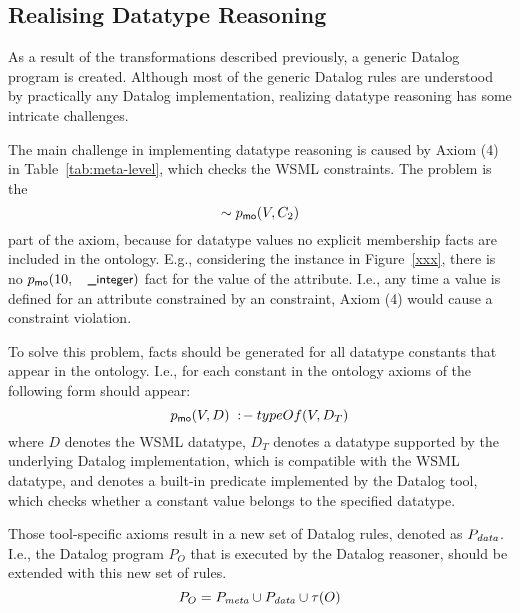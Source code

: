 \def\dataaxioms{\ensuremath{P_{\smtxtit{data}}}\xspace}
\def\transdpred{\transtxt{dpred}}

\subsection{Realising Datatype Reasoning}
\label{sec:datatype_reasoning}
As a result
of the transformations described previously, a generic Datalog
program is created. Although most of the generic Datalog rules are understood by practically any
Datalog implementation, realizing datatype reasoning has some
intricate challenges.

The main challenge in implementing datatype reasoning is caused by Axiom (4) in Table~\ref{tab:meta-level}, which checks the WSML  constraints. The problem is the \[\sim p_{\mathrm{\sf mo}}(V,C_2)\] part of the axiom, because for datatype values no explicit membership facts are included in the ontology. E.g., considering the instance  in Figure~\ref{xxx}, there is no $\pmo(10,\syn{\_integer})$ fact for the value of the  attribute. I.e., any time a value is defined for an attribute constrained by an  constraint, Axiom (4) would cause a constraint violation.

To solve this problem, \pmo facts should be generated for all datatype constants that
appear in the ontology. I.e., for each
constant in the ontology axioms of the following form should
appear:
\begin{displaymath}
    p_{\mathrm{\sf mo}}(V,D) \;:\!-\: typeOf(V, D_T)
\end{displaymath} where $D$ denotes the WSML datatype, $D_T$ denotes a datatype supported by the underlying Datalog implementation, which is compatible with the WSML datatype, and \typeof denotes a built-in predicate implemented by the Datalog tool, which checks whether a constant value belongs to the specified datatype.

Those tool-specific axioms result in a new set of Datalog rules, denoted as \dataaxioms. 
I.e., the Datalog program $P_O$ that is executed by the Datalog reasoner, should be extended with this new set of rules. 
\begin{displaymath}
    P_O = \mlaxioms \cup \dataaxioms \cup \tau(O)
\end{displaymath}

